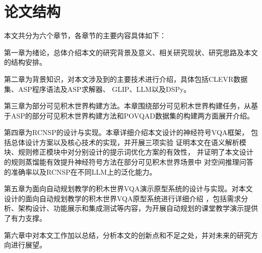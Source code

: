 \section{论文结构}
本文共分为六个章节，各章节的主要内容具体如下：

第一章为绪论，总体介绍本文的研究背景及意义、相关研究现状、研究思路及本文的结构安排。

第二章为背景知识，对本文涉及到的主要技术进行介绍，具体包括CLEVR数据集、ASP程序语法及ASP求解器、
GLIP、LLM以及DSPy。

第三章为部分可见积木世界构建方法。本章围绕部分可见积木世界构建任务，从基于ASP的部分可见积木世界构建方法和POVQAD数据集的构建两方面展开介绍。

第四章为RCNSP的设计与实现。本章详细介绍本文设计的神经符号VQA框架，
包括总体设计方案以及核心技术的实现，并开展三项实验
证明本文在语义解析模块、规则修正模块中对分别设计的提示词优化方案的有效性，
并证明了本文设计的规则蒸馏能有效提升神经符号方法在部分可见积木世界场景中
对空间推理问答的准确率以及RCNSP在不同LLM上的泛化能力。

第五章为面向自动规划教学的积木世界VQA演示原型系统的设计与实现。对本文设计的面向自动规划教学的积木世界VQA原型系统进行详细介绍
，包括需求分析、架构设计、功能展示和集成测试等内容，为开展自动规划的课堂教学演示提供了有力支撑。

第六章中对本文工作加以总结，分析本文的创新点和不足之处，并对未来的研究方向进行展望。
